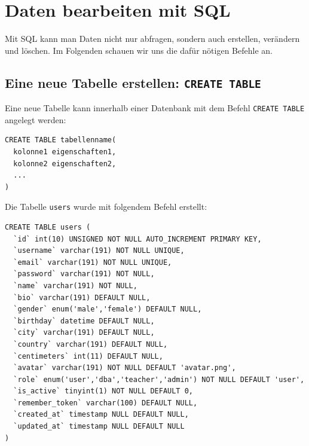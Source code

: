 \section{Daten bearbeiten mit \texorpdfstring{\gls{SQL}}{SQL}}
Mit SQL kann man Daten nicht nur abfragen, sondern auch erstellen, verändern und löschen. Im Folgenden schauen wir uns die dafür nötigen Befehle an.

\subsection{Eine neue Tabelle erstellen: \texorpdfstring{\lstinline|CREATE TABLE|}{CREATE TABLE}}
\label{subsec:create-table}
Eine neue Tabelle kann innerhalb einer Datenbank mit dem Befehl \lstinline|CREATE TABLE| angelegt werden:

\begin{lstlisting}
CREATE TABLE tabellenname(
  kolonne1 eigenschaften1,
  kolonne2 eigenschaften2,
  ...
)
\end{lstlisting}

\begin{myexample}
\label{ex:sql-create}
Die Tabelle \texttt{users} wurde mit folgendem Befehl erstellt:

\begin{lstlisting}
CREATE TABLE users (
  `id` int(10) UNSIGNED NOT NULL AUTO_INCREMENT PRIMARY KEY,
  `username` varchar(191) NOT NULL UNIQUE,
  `email` varchar(191) NOT NULL UNIQUE,
  `password` varchar(191) NOT NULL,
  `name` varchar(191) NOT NULL,
  `bio` varchar(191) DEFAULT NULL,
  `gender` enum('male','female') DEFAULT NULL,
  `birthday` datetime DEFAULT NULL,
  `city` varchar(191) DEFAULT NULL,
  `country` varchar(191) DEFAULT NULL,
  `centimeters` int(11) DEFAULT NULL,
  `avatar` varchar(191) NOT NULL DEFAULT 'avatar.png',
  `role` enum('user','dba','teacher','admin') NOT NULL DEFAULT 'user',
  `is_active` tinyint(1) NOT NULL DEFAULT 0,
  `remember_token` varchar(100) DEFAULT NULL,
  `created_at` timestamp NULL DEFAULT NULL,
  `updated_at` timestamp NULL DEFAULT NULL
)
\end{lstlisting}
\end{myexample}

